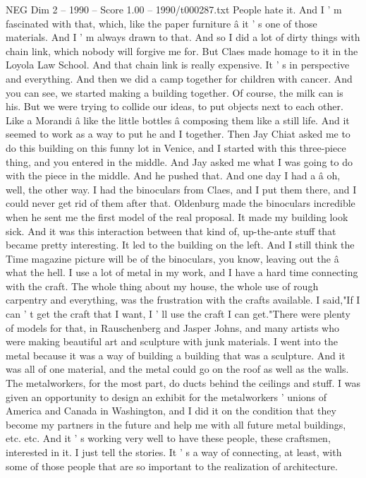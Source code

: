 \begin{textsample}{NEG Dim 2 – 1990 – Score 1.00 – 1990/t000287.txt}
People hate it.
And I ' m fascinated with that, which, like the paper furniture â it ' s one of those materials.
And I ' m always drawn to that.
And so I did a lot of dirty things with chain link, which nobody will forgive me for.
But Claes made homage to it in the Loyola Law School.
And that chain link is really expensive.
It ' s in perspective and everything.
And then we did a camp together for children with cancer.
And you can see, we started making a building together.
Of course, the milk can is his.
But we were trying to collide our ideas, to put objects next to each other.
Like a Morandi â like the little bottles â composing them like a still life.
And it seemed to work as a way to put he and I together.
Then Jay Chiat asked me to do this building on this funny lot in Venice, and I started with this three-piece thing, and you entered in the middle.
And Jay asked me what I was going to do with the piece in the middle.
And he pushed that.
And one day I had a â oh, well, the other way.
I had the binoculars from Claes, and I put them there, and I could never get rid of them after that.
Oldenburg made the binoculars incredible when he sent me the first model of the real proposal.
It made my building look sick.
And it was this interaction between that kind of, up-the-ante stuff that became pretty interesting.
It led to the building on the left.
And I still think the Time magazine picture will be of the binoculars, you know, leaving out the â what the hell.
I use a lot of metal in my work, and I have a hard time connecting with the craft.
The whole thing about my house, the whole use of rough carpentry and everything, was the frustration with the crafts available.
I said,"If I can ' t get the craft that I want, I ' ll use the craft I can get."There were plenty of models for that, in Rauschenberg and Jasper Johns, and many artists who were making beautiful art and sculpture with junk materials.
I went into the metal because it was a way of building a building that was a sculpture.
And it was all of one material, and the metal could go on the roof as well as the walls.
The metalworkers, for the most part, do ducts behind the ceilings and stuff.
I was given an opportunity to design an exhibit for the metalworkers ' unions of America and Canada in Washington, and I did it on the condition that they become my partners in the future and help me with all future metal buildings, etc. etc.
And it ' s working very well to have these people, these craftsmen, interested in it.
I just tell the stories.
It ' s a way of connecting, at least, with some of those people that are so important to the realization of architecture.

\end{textsample}
